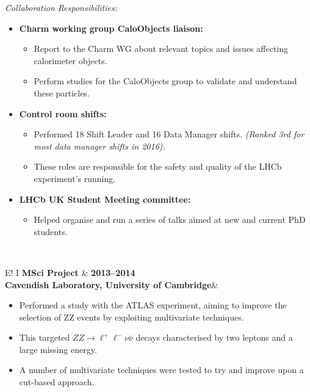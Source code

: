 \documentclass[11pt,a4paper]{article}
\newcommand\VRule{\color{lightgray}\vrule width 0.5pt}
\begin{document}
\noindent\emph{Collaboration Responsibilities:} 
\begin{itemize}
\setlength\itemsep{0em}
\item {\bf Charm working group CaloObjects liaison:}  
\begin{itemize}\setlength\itemsep{0em}
\item Report to the Charm WG about relevant topics and issues affecting calorimeter objects.
\item Perform studies for the CaloObjects group to validate and understand these particles.
\end{itemize}

\item {\bf Control room shifts:} 
\begin{itemize}
\setlength\itemsep{0em}
\item Performed 18 Shift Leader and 16 Data Manager shifts. \emph{(Ranked 3rd for most data manager shifts in 2016).}
\item These roles are responsible for the safety and quality of the LHCb experiment's running. 
\end{itemize}
\item {\bf LHCb UK Student Meeting committee:} 
\begin{itemize}
\setlength\itemsep{0em}
\item Helped organise and run a series of talks aimed at new and current PhD students.
\end{itemize}
\end{itemize}
~ 

\noindent\begin{tabular}{E!{\VRule} I }
{\bf MSci Project}   & {\bf2013--2014}\\
{\bf Cavendish Laboratory, University of Cambridge}&\\
\end{tabular}

\noindent
\begin{itemize}
\setlength\itemsep{0em}
\item Performed a study with the ATLAS experiment, aiming to improve the selection of ZZ events by exploiting multivariate techniques. 
\item This targeted $ZZ \to \ell^{+}\ell^{-} \nu \bar{\nu}$ decays characterised by two leptons and a large missing energy. 
\item A number of multivariate techniques were tested to try and improve upon a cut-based approach.\\
\end{itemize}
\end{document}
